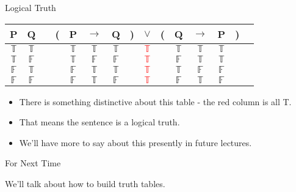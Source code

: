 \documentclass[
  ignorenonframetext,
]{beamer}
\providecommand{\tightlist}{%
  \setlength{\itemsep}{0pt}\setlength{\parskip}{0pt}}
\renewcommand{\,}{\text{, }}
\def\True{\mathbb{T}}
\def\False{\mathbb{F}}
\begin{document}
\begin{frame}{Logical Truth}
\protect\hypertarget{logical-truth}{}

\begin{center}
\begin{tabular}{@{ }c@{ }@{ }c | c@{ }@{}c@{}@{ }c@{ }@{ }c@{ }@{ }c@{ }@{}c@{}@{ }c@{ }@{}c@{}@{ }c@{ }@{ }c@{ }@{ }c@{ }@{}c@{}@{ }c}
P & Q &  & ( & P & $\rightarrow$ & Q & ) & $\lor$ & ( & Q & $\rightarrow$ & P & ) & \\
\hline 
$\True$ & $\True$ &  &  & $\True$ & $\True$ & $\True$ &  & \textcolor{red}{$\True$} &  & $\True$ & $\True$ & $\True$ &  & \\
$\True$ & $\False$ &  &  & $\True$ & $\False$ & $\False$ &  & \textcolor{red}{$\True$} &  & $\False$ & $\True$ & $\True$ &  & \\
$\False$ & $\True$ &  &  & $\False$ & $\True$ & $\True$ &  & \textcolor{red}{$\True$} &  & $\True$ & $\False$ & $\False$ &  & \\
$\False$ & $\False$ &  &  & $\False$ & $\True$ & $\False$ &  & \textcolor{red}{$\True$} &  & $\False$ & $\True$ & $\False$ &  & \\
\end{tabular}
\bigskip
\end{center}

\begin{itemize}
\tightlist
\item
  There is something distinctive about this table - the red column is
  all T.
\item
  That means the sentence is a logical truth.
\item
  We'll have more to say about this presently in future lectures.
\end{itemize}

\end{frame}

\begin{frame}{For Next Time}
\protect\hypertarget{for-next-time}{}

We'll talk about how to build truth tables.

\end{frame}
\end{document}
